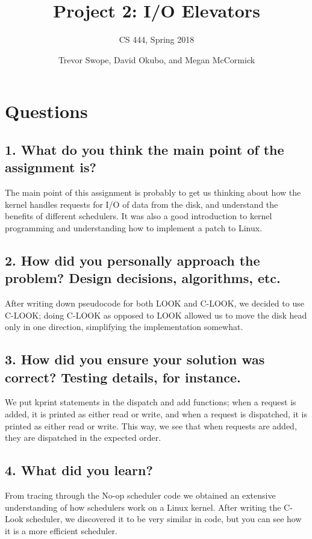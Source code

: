 \documentclass[letterpaper,10pt]{article}
\title{Project 2: I/O Elevators}
\subtitle{CS 444, Spring 2018}
\author{Trevor Swope, David Okubo, and Megan McCormick}
\begin{document}
\begin{titlingpage}
\maketitle 
\begin{abstract}

\end{abstract}
\end{titlingpage}
\section{Questions}
\subsection{1. What do you think the main point of the assignment is?}
The main point of this assignment is probably to get us thinking about how the kernel handles requests for I/O of data from the disk, and understand the benefits of different schedulers. It was also a good introduction to kernel programming and understanding how to implement a patch to Linux.

\subsection{2. How did you personally approach the problem? Design decisions, algorithms, etc.}
After writing down pseudocode for both LOOK and C-LOOK, we decided to use C-LOOK; doing C-LOOK as opposed to LOOK allowed us to move the disk head only in one direction, simplifying the implementation somewhat.

\subsection{3. How did you ensure your solution was correct? Testing details, for instance.}
We put kprint statements in the dispatch and add functions; when a request is added, it is printed as either read or write, and when a request is dispatched, it is printed as either read or write. This way, we see that when requests are added, they are dispatched in the expected order.

\subsection{4. What did you learn?}
From tracing through the No-op scheduler code we obtained an extensive understanding of how schedulers work on a Linux kernel. After writing the C-Look scheduler, we discovered it to be very similar in code, but you can see how it is a more efficient scheduler.
\end{document}
